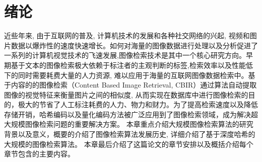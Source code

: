 
\chapter{绪论}
近些年来, 由于互联网的普及, 计算机技术的发展和各种社交网络的兴起, 视频和图片数据以爆炸性的速度快速增长。如何对海量的图像数据进行处理以及分析促进了一系列的计算机视觉技术的飞速发展,图像检索技术是其中一个核心研究方向。早期基于文本的图像检索极大依赖于标注者的主观判断的标签,检索效率以及性能低下的同时需要耗费大量的人力资源, 难以应用于海量的互联网图像数据检索中。基于内容的的图像检索（Content Based Image Retrieval, CBIR）通过算法自动提取图像的视觉特征来衡量图片之间的相似度, 从而实现在数据库中进行图像检索的目的，极大的节省了人工标注耗费的人力、物力和财力。为了提高检索速度以及降低存储开销，哈希编码以及量化编码方法被广泛应用到了图像检索领域，成为解决超大规模图像检索问题的重要解决方案。 本章重点介绍大规模图像检索算法的研究背景以及意义，概要的介绍了图像检索算法发展历史, 详细介绍了基于深度哈希的大规模的图像检索算法。 本章最后介绍了这篇论文的章节安排以及概括介绍每个章节包含的主要内容。
